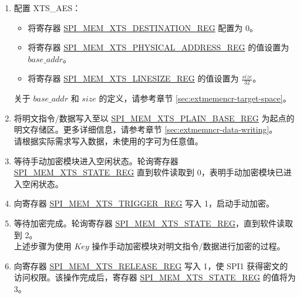 \documentclass[main\_\_CN.tex]{subfiles}
\begin{document}
\begin{enumerate}

    \item 配置 XTS\_AES：
    \begin{itemize}
        \item 将寄存器 \hyperref[regdesc:SPIMEMXTSDESTINATIONREG]{SPI\_MEM\_XTS\_DESTINATION\_REG} 配置为 0。
        \item 将寄存器 \hyperref[regdesc:SPIMEMXTSPHYSICALADDRESSREG]{SPI\_MEM\_XTS\_PHYSICAL\_ADDRESS\_REG} 的值设置为 \begin{math}base\_addr\end{math}。
        \item 将寄存器 \hyperref[regdesc:SPIMEMXTSLINESIZEREG]{SPI\_MEM\_XTS\_LINESIZE\_REG} 的值设置为 \begin{math}\frac{size}{32}\end{math}。
    \end{itemize}
    关于 \begin{math} base\_addr\end{math} 和 \begin{math}size\end{math} 的定义，请参考章节 \ref{sec:extmemencr-target-space}。
    \item 将明文指令/数据写入至以 \hyperref[regdesc:SPIMEMXTSPLAINBASEREG]{SPI\_MEM\_XTS\_PLAIN\_BASE\_REG} 为起点的明文存储区。更多详细信息，请参考章节 \ref{sec:extmemncr-data-writing}。\\请根据实际需求写入数据，未使用的字可为任意值。

    \item 等待手动加密模块进入空闲状态。轮询寄存器 \hyperref[regdesc:SPIMEMXTSSTATEREG]{SPI\_MEM\_XTS\_STATE\_REG} 直到软件读取到 0，表明手动加密模块已进入空闲状态。

    \item 向寄存器 \hyperref[regdesc:SPIMEMXTSTRIGGERREG]{SPI\_MEM\_XTS\_TRIGGER\_REG} 写入 1，启动手动加密。

    \item 等待加密完成。轮询寄存器 \hyperref[regdesc:SPIMEMXTSSTATEREG]{SPI\_MEM\_XTS\_STATE\_REG}，直到软件读取到 2。\\
    上述步骤为使用 \begin{math}\mathit{Key}\end{math} 操作手动加密模块对明文指令/数据进行加密的过程。

    \item 向寄存器 \hyperref[regdesc:SPIMEMXTSRELEASEREG]{SPI\_MEM\_XTS\_RELEASE\_REG} 写入 1，使 SPI1 获得密文的访问权限。该操作完成后，寄存器 \hyperref[regdesc:SPIMEMXTSSTATEREG]{SPI\_MEM\_XTS\_STATE\_REG} 的值将为 3。


\end{enumerate}
\end{document}
